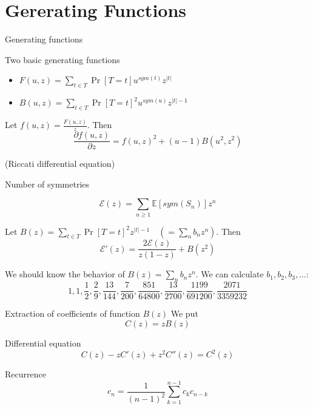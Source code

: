 \documentclass{beamer}
\begin{document}
\section{Gererating Functions}


\begin{frame}{Generating functions}

\begin{block}{Two basic generating functions}
\begin{itemize}
\item $F(u,z) = \sum_{t\in T} \Pr[T=t] u^{sym(t)} z^{|t|}$
\item $B(u,z) = \sum_{t\in T} \Pr[T=t]^2 u^{sym(u)} z^{|t|-1}$ 
\end{itemize}
\end{block}


\begin{theorem}Let $f(u,z) = \frac{F(u,z)}{z}$. Then
$$
\frac{\partial  f(u,z)}{\partial z} = f(u,z)^2 + (u-1)B(u^2,z^2)
$$ 
\end{theorem}
(Riccati differential equation)
\end{frame}

\begin{frame}{Number of symmetries}
\begin{definition}
$$\mathcal{E}(z) = \sum_{n\geq 1} \mathbb{E}[sym(S_n)]z^n$$
\end{definition}

\begin{theorem}
Let $B(z) = \sum_{t\in T} \Pr[T=t]^2 z^{|t|-1}  \quad (= \sum_n b_n z^n)$. Then
$$
  \mathcal{E}'(z) = \frac{2\mathcal{E}(z)}{z(1-z)} + B(z^2)
$$
\end{theorem}

We should know the behavior of $B(z)=\sum_{n}b_nz^n$. We can calculate $b_1,b_2,b_3,\ldots$:
$$
1,1,\frac{1}{2},\frac{2}{9},\frac{13}{144},\frac{7}{200},\frac{851}{64800},\frac{13}{2700},\frac{1199}{691200},\frac{2071}{3359232}
$$
\end{frame}

\begin{frame}{Extraction of coefficients of function $B(z)$}
We put
$$
  C(z) = z B(z)
$$
\begin{block}{Differential equation}
$$
  C(z) - zC'(z) + z^2 C''(z) = C^2(z)
$$
\end{block}
\begin{block}{Recurrence}
$$
  c_n = \frac{1}{(n-1)^2} \sum_{k=1}^{n-1} c_k c_{n-k}
$$
\end{block}
\end{frame}
\end{document}
